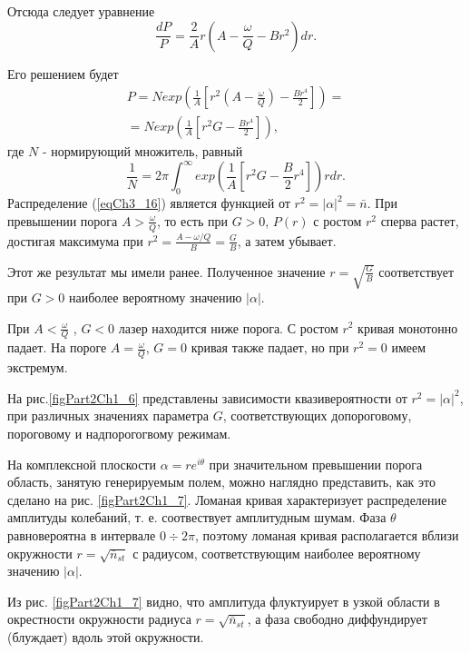 Отсюда следует уравнение
\begin{equation}
\frac{d P}{P} = 
\frac{2}{A} r \left(A - \frac{\omega}{Q} - B r^2\right)d r. 
\label{eqCh3_15}
\end{equation}

Его решением будет
\begin{eqnarray}
P = N exp \left(\frac{1}{A}
\left[
r^2 \left(A - \frac{\omega}{Q}\right)
 - 
\frac{B r^4}{2}
\right]
\right) = 
\nonumber \\
= 
N exp \left(\frac{1}{A}
\left[
r^2 G
 - 
\frac{B r^4}{2}
\right]
\right),
\label{eqCh3_16}
\end{eqnarray}
где $N$ - нормирующий множитель, равный
\[
\frac{1}{N} = 2 \pi \int_0^{\infty}
exp\left(
\frac{1}{A}\left[
r^2 G - \frac{B}{2}r^4
\right]
\right)
r dr.
\]
Распределение (\ref{eqCh3_16})
является функцией от $r^2 = \left|\alpha\right|^2 = \bar{n}$. При
превышении порога $A > \frac{\omega}{Q}$,  то есть при $G > 0$,
$P\left(r\right)$ с ростом $r^2$ сперва растет, достигая максимума при
$r^2 = \frac{A - \omega/Q}{B} = \frac{G}{B}$, а затем убывает.  

Этот же результат мы имели ранее. Полученное значение $r =
\sqrt{\frac{G}{B}}$ соответствует при $G > 0$ наиболее вероятному
значению $\left|\alpha\right|$.
  
При $A < \frac{\omega}{Q}$ , $G < 0$ лазер находится ниже порога. С
ростом $r^2$ кривая монотонно падает. На пороге $A =
\frac{\omega}{Q}$,  $G = 0$  кривая также падает, но при $r^2 = 0$
имеем экстремум.   



На рис.\ref{figPart2Ch1_6} представлены зависимости квазивероятности от $r^2 =
\left|\alpha\right|^2$, при различных значениях параметра $G$,
соответствующих допороговому, пороговому и надпорогогвому режимам. 

На комплексной плоскости $\alpha = r e^{i \theta}$ при значительном
превышении порога область, занятую генерируемым полем, можно наглядно
представить, как это сделано на
рис. \ref{figPart2Ch1_7}. Ломаная кривая характеризует
распределение амплитуды колебаний, т. е. соотвествует амплитудным 
шумам. Фаза $\theta$ равновероятна в интервале  $0 \div 2\pi$,
поэтому ломаная кривая располагается вблизи окружности $r =
\sqrt{\bar{n}_{st}}$ с радиусом, соответствующим наиболее вероятному
значению $\left|\alpha\right|$. 



Из рис. \ref{figPart2Ch1_7} видно, что амплитуда флуктуирует в узкой области в
окрестности окружности радиуса $r = \sqrt{\bar{n}_{st}}$,  а фаза
свободно диффундирует (блуждает) вдоль этой окружности. 

